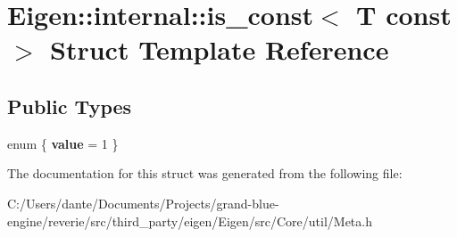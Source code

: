 \hypertarget{struct_eigen_1_1internal_1_1is__const_3_01_t_01const_01_4}{}\section{Eigen\+::internal\+::is\+\_\+const$<$ T const $>$ Struct Template Reference}
\label{struct_eigen_1_1internal_1_1is__const_3_01_t_01const_01_4}
\subsection*{Public Types}
\begin{DoxyCompactItemize}
\item 
\mbox{\label{struct_eigen_1_1internal_1_1is__const_3_01_t_01const_01_4_a8c3efac6df284cbf53d30a2cb6f1ca04}} 
enum \{ {\bfseries value} = 1
 \}
\end{DoxyCompactItemize}


The documentation for this struct was generated from the following file\+:\begin{DoxyCompactItemize}
\item 
C\+:/\+Users/dante/\+Documents/\+Projects/grand-\/blue-\/engine/reverie/src/third\+\_\+party/eigen/\+Eigen/src/\+Core/util/Meta.\+h\end{DoxyCompactItemize}
